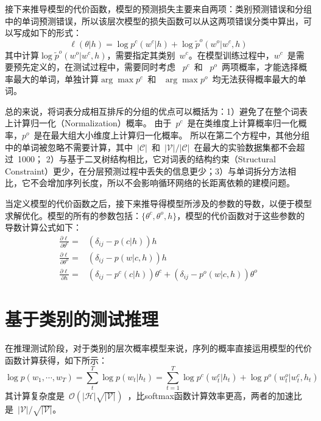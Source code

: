 接下来推导模型的代价函数，模型的预测损失主要来自两项：类别预测错误和分组中的单词预测错误，所以该层次模型的损失函数可以从这两项错误分类中算出，可以写成如下的形式：
\begin{equation}
\ell(\theta|h) =\log p^c(w^c|h) +\log \tilde  p^o(w^o|w^c,h)
\end{equation}
其中计算$\log \tilde  p^o(w^o|w^c,h)$，需要指定其类别~$w^c$。在模型训练过程中，$w^c$~是需要预先定义的，在测试过程中，需要同时考虑 ~$p^c$~和 ~$p^o$~两项概率，才能选择概率最大的单词，单独计算$\arg\max p^c$~和 ~$\arg\max p^o$~均无法获得概率最大的单词。

总的来说，将词表分成相互排斥的分组的优点可以概括为：1）避免了在整个词表上计算归一化（Normalization）概率。 由于~$p^c$~是在类维度上计算概率归一化概率，$p^o$~是在最大组大小维度上计算归一化概率。 所以在第二个方程中，其他分组中的单词被忽略不需要计算，其中~$\mathcal{|C|}$~和~$\mathcal{|V|}/\mathcal{|C|}$~在最大的实验数据集都不会超过~1000； 2）与基于二叉树结构相比，它对词表的结构约束（Structural Constraint）更少，在分层预测过程中丢失的信息更少；3）与单词拆分方法相比，它不会增加序列长度，所以不会影响循环网络的长距离依赖的建模问题。

当定义模型的代价函数之后，接下来推导得模型所涉及的参数的导数，以便于模型求解优化。模型的所有的参数包括：$\{\theta^c,\theta^o,h\}$，模型的代价函数对于这些参数的导数计算公式如下：
\begin{equation}
\begin{split}
\frac{\partial \ell}{\partial \theta^c}=& (\delta_{ij}-p(c|h))h \\
\frac{\partial \ell}{\partial \theta^o}=&(\delta_{ij}-p(w|c,h))h \\
\frac{\partial \ell}{\partial h}=&(\delta_{ij}-p^c(c|h))\theta^c + (\delta_{ij}-p^o(w|c,h))\theta^o
\end{split}
\end{equation}


\section{基于类别的测试推理}
在推理测试阶段，对于类别的层次概率模型来说，序列的概率直接运用模型的代价函数计算获得，如下所示：
\begin{equation}\label{equ:class_inf}
\log p(w_1,\cdots, w_T)=\sum_t^T\log p(w_t|h_t) =\sum_{t=1}^{T}\log p^c(w^c_t|h_t) +\log p^o(w^o_t|w^c_t,h_t)
\end{equation}
其计算复杂度是~$\mathcal{O(|H|\sqrt{|\mathcal{V}|})}$~，比softmax函数计算效率更高，两者的加速比是~$|\mathcal{V}|/\sqrt{|\mathcal{V}|}$。

